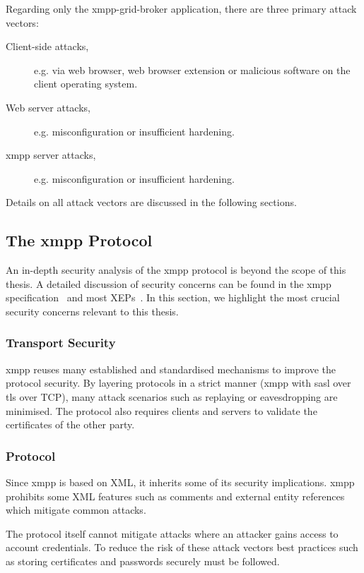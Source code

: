 Regarding only the \gls{xmpp-grid-broker} application, there are three primary attack vectors:

\begin{description}
    \item[Client-side attacks,] e.g. via web browser, web browser extension or malicious software on the client operating system.
    \item[Web server attacks,] e.g. misconfiguration or insufficient hardening.
    \item[\gls{xmpp} server attacks,] e.g. misconfiguration or insufficient hardening.
\end{description}

Details on all attack vectors are discussed in the following sections.

\subsection{The \gls{xmpp} Protocol}

An in-depth security analysis of the \gls{xmpp} protocol is beyond the scope of this thesis.
A detailed discussion of security concerns can be found in the \gls{xmpp} specification~\cite{rfc6120} and most XEPs~\cite{xep-0060}\cite{xep-0248}.
In this section, we highlight the most crucial security concerns relevant to this thesis.

\subsubsection{Transport Security}

\gls{xmpp} reuses many established and standardised mechanisms to improve the protocol security.
By layering protocols in a strict manner (\gls{xmpp} with \gls{sasl} over \gls{tls} over TCP), many attack scenarios such as replaying or eavesdropping are minimised.
The protocol also requires clients and servers to validate the certificates of the other party.~\cite{rfc7590}\cite{rfc6120}

\subsubsection{Protocol}

Since \gls{xmpp} is based on XML, it inherits some of its security implications.
\gls{xmpp} prohibits some XML features such as comments and external entity references which mitigate common attacks.~\cite{rfc6120}

The protocol itself cannot mitigate attacks where an attacker gains access to account credentials.
To reduce the risk of these attack vectors best practices such as storing certificates and passwords securely must be followed.

